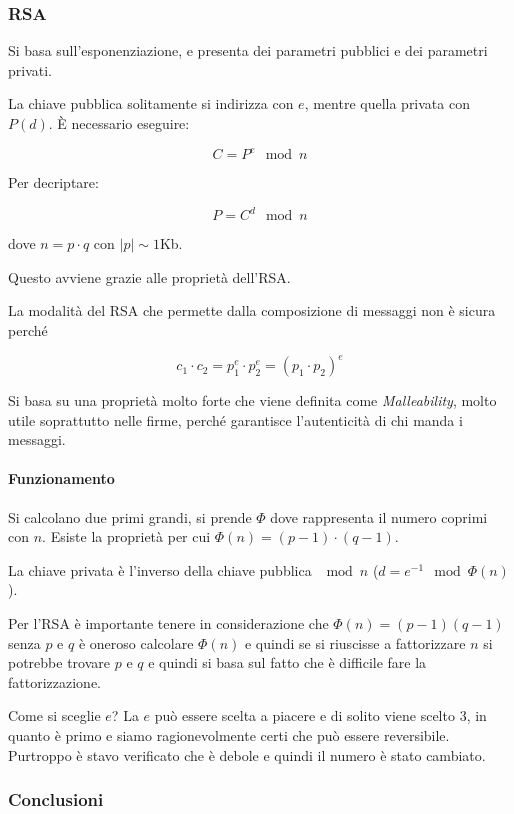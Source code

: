 \subsubsection{RSA}

Si basa sull'esponenziazione, e presenta dei parametri pubblici e dei parametri
privati.


La chiave pubblica solitamente si indirizza con $e$, mentre quella privata con
$P(d)$. È necessario eseguire:

\[ C = P^e \mod n \]

Per decriptare:

\[ P = C^d \mod n \]

dove $n = p \cdot q$ con $|p| \sim 1$Kb.

Questo avviene grazie alle proprietà dell'RSA.

La modalità del RSA che permette dalla composizione di messaggi non è sicura
perché

\[ c_1 \cdot c_2 = p_1^e \cdot p_2^e = (p_1 \cdot p_2)^e\]


Si basa su una proprietà molto forte che viene definita come
\textit{Malleability}, molto utile soprattutto nelle firme, perché garantisce
l'autenticità di chi manda i messaggi.


\paragraph{Funzionamento}

Si calcolano due primi grandi, si prende $\Phi$ dove rappresenta il numero
coprimi con $n$.
Esiste la proprietà per cui $\Phi(n) = (p-1) \cdot (q-1)$.

La chiave privata è l'inverso della chiave pubblica $\mod n$ ($d = e^{-1}
\mod \Phi(n)$).

Per l'RSA \`e importante tenere in considerazione che $\Phi(n) = (p-1)(q-1)$
senza $p$ e $q$ è oneroso calcolare $\Phi(n)$ e quindi se si riuscisse a
fattorizzare $n$ si potrebbe trovare $p$ e $q$ e quindi si basa sul fatto che è
difficile fare la fattorizzazione.

Come si sceglie $e$? La $e$ può essere scelta a piacere e di solito viene scelto
$3$, in quanto è primo e siamo ragionevolmente certi che può essere reversibile.
Purtroppo è stavo verificato che è debole e quindi il numero è stato cambiato.

\subsubsection{Conclusioni}


